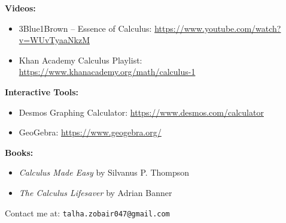\documentclass[12pt,a4paper]{article}
\begin{document}
\textbf{Videos:}
\begin{itemize}
    \item 3Blue1Brown – Essence of Calculus: \url{https://www.youtube.com/watch?v=WUvTyaaNkzM}
    \item Khan Academy Calculus Playlist: \url{https://www.khanacademy.org/math/calculus-1}
\end{itemize}

\textbf{Interactive Tools:}
\begin{itemize}
    \item Desmos Graphing Calculator: \url{https://www.desmos.com/calculator}
    \item GeoGebra: \url{https://www.geogebra.org/}
\end{itemize}

\textbf{Books:}
\begin{itemize}
    \item \textit{Calculus Made Easy} by Silvanus P. Thompson
    \item \textit{The Calculus Lifesaver} by Adrian Banner
\end{itemize}

\vspace{1cm}
Contact me at: \texttt{talha.zobair047@gmail.com} \\
\end{document}
